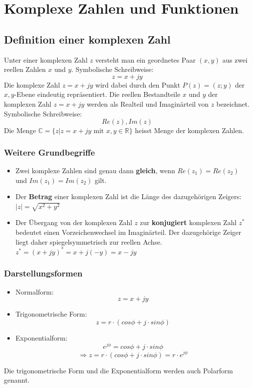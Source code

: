 \chapter{Komplexe Zahlen und Funktionen}
\section{Definition einer komplexen Zahl}
Unter einer komplexen Zahl $z$ versteht man ein geordnetes Paar $(x, y)$ aus zwei reellen Zahlen $x$ und $y$. Symbolische Schreibweise:
$$z=x + jy$$
Die komplexe Zahl $z = x + jy$ wird dabei durch den Punkt $P(z) = (z; y)$ der $x, y$-Ebene eindeutig repräsentiert. Die reellen Bestandteile $x$ und $y$ der komplexen Zahl $z = x+ jy$ werden als Realteil und Imaginärteil von $z$ bezeichnet. Symbolische Schreibweise:
$$Re(z), Im(z)$$
Die Menge $\mathbb{C}=\{z|z=x+jy \text{ mit } x, y \in \mathbb{R}\}$ heisst Menge der komplexen Zahlen.
\subsection{Weitere Grundbegriffe}
\begin{itemize}
	\item Zwei komplexe Zahlen sind genau dann \textbf{gleich}, wenn $Re(z_1) = Re(z_2)$ und $Im(z_1) = Im(z_2)$ gilt.
	\item Der \textbf{Betrag} einer komplexen Zahl ist die Länge des dazugehörigen Zeigers: $|z| = \sqrt{x^2+y^2}$
	\item Der Übergang von der komplexen Zahl $z$ zur \textbf{konjugiert} komplexen Zahl $z^*$ bedeutet einen Vorzeichenwechsel im Imaginärteil. Der dazugehörige Zeiger liegt daher spiegelsymmetrisch zur reellen Achse. $z^* = (x + jy)^* = x + j(-y) = x - jy$
\end{itemize}

\subsection{Darstellungsformen}
\begin{itemize}
	\item Normalform: $$z=x + jy$$
	\item Trigonometrische Form: $$z= r \cdot (cos\phi + j \cdot sin\phi)$$ 
	\item Exponentialform: $$e^{j\phi} =  cos\phi + j \cdot sin\phi$$ $$ \Rightarrow z = r \cdot (cos\phi + j \cdot sin\phi) = r \cdot e^{j\phi}$$
\end{itemize}
Die trigonometrische Form und die Exponentialform werden auch Polarform genannt.

